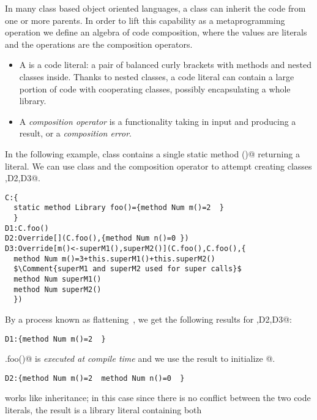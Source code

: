 In many class based object oriented languages, a class can inherit the code
from one or more parents.
In order to lift this capability as a metaprogramming operation 
we define an algebra of code composition, where the values
are \Q@Library@ literals and the operations are the composition operators.

\begin{itemize}
\item A \Q@Library@ is a code literal:
a pair of balanced curly brackets with methods and nested classes inside.
Thanks to nested classes, a code literal can contain a large portion of code
with cooperating classes, possibly encapsulating a whole library.
\item A \emph{composition operator}
is a functionality taking in input \Q@Library@s and producing a \Q@Library@
result, or a \emph{composition error}.
\end{itemize}


In the following example, class \Q@C@ contains a single static 
method \Q@foo()@ returning a \Q@Library@ literal.
We can use class \Q@C@ and the \Q@Override@ composition operator to
attempt creating classes ,D2,D3@.

\begin{lstlisting}
C:{
  static method Library foo()={method Num m()=2  }  
  }
D1:C.foo()
D2:Override[](C.foo(),{method Num n()=0 })
D3:Override[m()<-superM1(),superM2()](C.foo(),C.foo(),{
  method Num m()=3+this.superM1()+this.superM2()
  $\Comment{superM1 and superM2 used for super calls}$
  method Num superM1()
  method Num superM2()
  })
\end{lstlisting}

By a process known as flattening~\cite{scharli2003traits}, we get the following results for ,D2,D3@:

\begin{lstlisting}
D1:{method Num m()=2  }  
\end{lstlisting}

\Q@C.foo()@ is \emph{executed at compile time}
and we use the result to initialize @.

\begin{lstlisting}
D2:{method Num m()=2  method Num n()=0  }  
\end{lstlisting}

\Q@Override@ works like inheritance; in this case since there is no conflict between
the two code literals, the result is a library literal containing both

